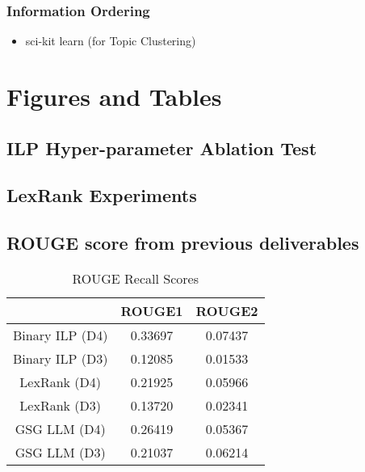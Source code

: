\subsubsection{Information Ordering}

\begin{itemize}
    \item sci-kit learn (for Topic Clustering)
\end{itemize}

\section{Figures and Tables} \label{appendixtable}

\subsection{ILP Hyper-parameter Ablation Test}

% 

\subsection{LexRank Experiments}

\subsection{ROUGE score from previous deliverables}

\begin{table}[H]
    \caption{ROUGE Recall Scores}
    \centering
    \begin{tabular}{||c|c|c||}
        \hline 
        \hline 
         & ROUGE1 & ROUGE2 \\
         \hline
         Binary ILP (D4) & 0.33697 & 0.07437 \\
         \hline
         Binary ILP (D3) & 0.12085 & 0.01533 \\
         \hline
         LexRank (D4) &  0.21925 & 0.05966\\
         \hline
        LexRank (D3) & 0.13720 & 0.02341\\
         \hline
          GSG LLM (D4) & 0.26419 & 0.05367 \\
         \hline
         GSG LLM (D3) & 0.21037 & 0.06214 \\
         \hline
         \hline
    \end{tabular}
    \label{tab:rouge}
\end{table}